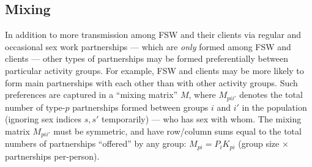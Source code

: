 \subsection{Mixing}\label{mod.par.mix}
In addition to more transmission among FSW and their clients
via regular and occasional sex work partnerships
--- which are \emph{only} formed among FSW and clients ---
other types of partnerships may be formed
preferentially between particular activity groups.
For example, FSW and clients may be more likely to form main partnerships
with each other than with other activity groups.
Such preferences are captured in a ``mixing matrix'' $M$, where $M_{pii'}$ denotes
the total number of type-$p$ partnerships formed between groups $i$ and $i'$ in the population
(ignoring sex indices $s,s'$ temporarily)
--- \ie who has sex with whom.
The mixing matrix $M_{pii'}$ must be symmetric,
and have row/column sums equal to the total numbers of partnerships ``offered'' by any group:
$M_{pi} = P_{i} K_{pi}$ (group size $\times$ partnerships per-person).
